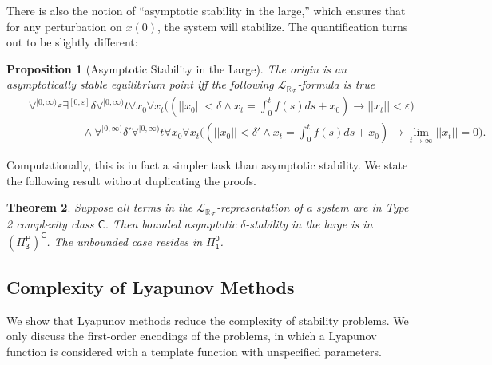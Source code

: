 \documentclass[12pt]{article}
\theoremstyle{plain}
\newtheorem{theorem}{Theorem}[section]
\newtheorem{proposition}[theorem]{Proposition}
\theoremstyle{definition}
\newcommand{\lrf}{\mathcal{L}_{\mathbb{R}_{\mathcal{F}}}}
\begin{document}
There is also the notion of ``asymptotic stability in the large,'' which ensures that for any perturbation on $x(0)$, the system will stabilize. The quantification turns out to be slightly different:
\begin{proposition}[Asymptotic Stability in the Large]
The origin is an asymptotically stable equilibrium point iff the following $\lrf$-formula is true
\begin{eqnarray*}
& &\forall^{[0,\infty)} \varepsilon\exists^{[0,\varepsilon]} \delta\forall^{[0,\infty)} t\forall x_0\forall x_t\Big((||x_0||<\delta \wedge x_t = \int_0^t f(s)ds + x_0 )\rightarrow ||x_t||<\varepsilon\Big)\\
& &\hspace{2cm}\wedge \forall^{[0,\infty)} \delta'  \forall^{[0,\infty)} t\forall x_0\forall x_t\Big( (||x_0||<\delta'\wedge x_t = \int_0^t f(s)ds + x_0 )\rightarrow \lim_{t\rightarrow \infty} ||x_t|| = 0\Big).
\end{eqnarray*}
\end{proposition}
Computationally, this is in fact a simpler task than asymptotic stability. We state the following result without duplicating the proofs.
\begin{theorem}
Suppose all terms in the $\lrf$-representation of a system are in Type 2 complexity class $\mathsf{C}$. Then bounded asymptotic $\delta$-stability in the large is in $\mathsf{(\Pi^P_3)^C}$. The unbounded case resides in $\mathsf{\Pi^0_1}$.
\end{theorem}


\subsection{Complexity of Lyapunov Methods}

We show that Lyapunov methods reduce the complexity of stability problems. We only discuss the first-order encodings of the problems, in which a Lyapunov function is considered with a template function with unspecified parameters.
\end{document}
